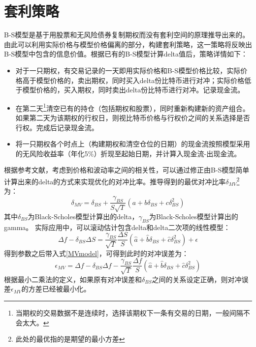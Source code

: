     \section{套利策略}\label{strategy}
    B-S模型是基于用股票和无风险债券复制期权而没有套利空间的原理推导出来的。由此可以利用实际价格与模型价格偏离的部分，构建套利策略，这一策略将反映出B-S模型中包含的信息价值。根据已有的B-S模型计算delta值后，策略详情如下：
    \begin{itemize}
        \item 对于一只期权，有交易记录的一天即用实际价格和B-S模型价格比较，实际价格高于模型价格的，卖出期权，同时买入delta份比特币进行对冲；实际价格低于模型价格的，买入期权，同时卖出delta份比特币进行对冲。记录现金流。
        \item 在第二天\footnote{当期权的交易数据不是连续时，选择该期权下一条有交易的日期，一般间隔不会太大。}清空已有的持仓（包括期权和股票），同时重新构建新的资产组合。如果第二天为该期权的行权日，则视比特币价格与行权价之间的关系选择是否行权。完成后记录现金流。
        \item 将一只期权各个时点上（构建期权和清空仓位的日期）的现金流按照模型采用的无风险收益率（年化5$\%$）折现至起始日期，并计算入现金流-出现金流。
    \end{itemize}
    根据参考文献\cite{Hull-2017}，考虑到价格和波动率之间的相关性，可以通过修正由B-S模型简单计算出来的delta的方式来实现优化的对冲比率。推导得到的最优对冲比率$\delta_{MV}$\footnote{此处的最优指的是期望的最小方差}为：
    \begin{equation}\label{MVmodel}
        \delta_{MV}=\delta_{BS}+\frac{\gamma_{BS}}{S\sqrt{T}}(a+b\delta_{BS}+c\delta^2_{BS})
    \end{equation}
    其中$\delta_{BS}$为Black-Scholes模型计算出的delta，$\gamma_{BS}$为Black-Scholes模型计算出的gamma。
    实际应用中，可以滚动估计包含delta和delta二次项的线性模型：
    \begin{equation}
        \Delta{f}-\delta_{BS}\Delta{S}=\frac{\gamma_{BS}}{\sqrt{T}}\frac{\Delta{S}}{S}(\hat{a}+\hat{b}\delta_{BS}+\hat{c}\delta^2_{BS})+\epsilon
    \end{equation}
    得到参数之后带入式\ref{MVmodel}，可得到此时的对冲误差为：
    \begin{equation}
        \epsilon_{MV}=\Delta{f}-\delta_{BS}\Delta{f}-\frac{\gamma_{BS}}{\sqrt{T}}\frac{\Delta{f}}{S}(\hat{a}+\hat{b}\delta_{BS}+\hat{c}\delta^2_{BS})
    \end{equation}
    根据最小二乘法的定义，如果原有对冲误差和$\delta_{BS}$之间的关系设定正确，则对冲误差$\epsilon_{MV}$的方差已经被最小化。
    